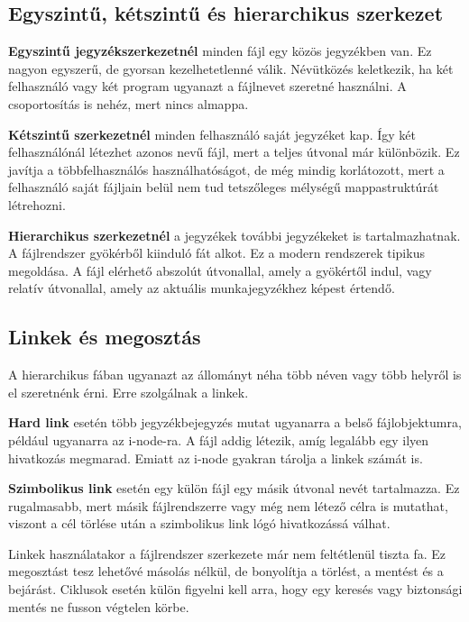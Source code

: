 \subsection{Egyszintű, kétszintű és hierarchikus szerkezet}



\textbf{Egyszintű jegyzékszerkezetnél} minden fájl egy közös jegyzékben van. Ez nagyon egyszerű, de gyorsan kezelhetetlenné válik. Névütközés keletkezik, ha két felhasználó vagy két program ugyanazt a fájlnevet szeretné használni. A csoportosítás is nehéz, mert nincs almappa.

\textbf{Kétszintű szerkezetnél} minden felhasználó saját jegyzéket kap. Így két felhasználónál létezhet azonos nevű fájl, mert a teljes útvonal már különbözik. Ez javítja a többfelhasználós használhatóságot, de még mindig korlátozott, mert a felhasználó saját fájljain belül nem tud tetszőleges mélységű mappastruktúrát létrehozni.

\textbf{Hierarchikus szerkezetnél} a jegyzékek további jegyzékeket is tartalmazhatnak. A fájlrendszer gyökérből kiinduló fát alkot. Ez a modern rendszerek tipikus megoldása. A fájl elérhető abszolút útvonallal, amely a gyökértől indul, vagy relatív útvonallal, amely az aktuális munkajegyzékhez képest értendő.

\begin{center}

\end{center}

\subsection{Linkek és megosztás}

A hierarchikus fában ugyanazt az állományt néha több néven vagy több helyről is el szeretnénk érni. Erre szolgálnak a linkek.

\textbf{Hard link} esetén több jegyzékbejegyzés mutat ugyanarra a belső fájlobjektumra, például ugyanarra az i-node-ra. A fájl addig létezik, amíg legalább egy ilyen hivatkozás megmarad. Emiatt az i-node gyakran tárolja a linkek számát is.

\textbf{Szimbolikus link} esetén egy külön fájl egy másik útvonal nevét tartalmazza. Ez rugalmasabb, mert másik fájlrendszerre vagy még nem létező célra is mutathat, viszont a cél törlése után a szimbolikus link lógó hivatkozássá válhat.

Linkek használatakor a fájlrendszer szerkezete már nem feltétlenül tiszta fa. Ez megosztást tesz lehetővé másolás nélkül, de bonyolítja a törlést, a mentést és a bejárást. Ciklusok esetén külön figyelni kell arra, hogy egy keresés vagy biztonsági mentés ne fusson végtelen körbe.

